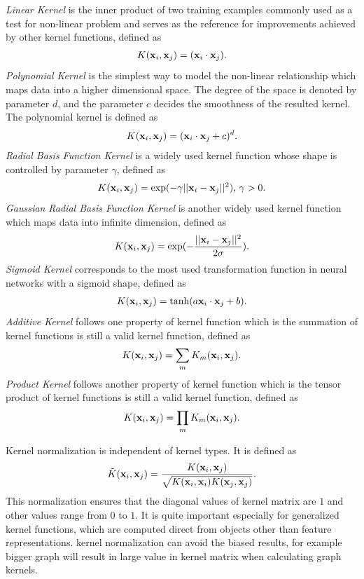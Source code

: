 \documentclass[english]{tktltiki}
\newcommand{\xb}{{\bf x}}
\begin{document}
{\em Linear Kernel} is the inner product of two training examples commonly used as a test for non-linear problem and serves as the reference for improvements achieved by other kernel functions, defined as
\begin{align*}
K(\xb_i,\xb_j) = (\xb_i \cdot \xb_j) \text{.}
\end{align*}
{\em Polynomial Kernel} is the simplest way to model the non-linear relationship which maps data into a higher dimensional space. The degree of the space is denoted by parameter $d$, and the parameter $c$ decides the smoothness of the resulted kernel. The polynomial kernel is defined as
\begin{align*}
K(\xb_i,\xb_j) = (\xb_i \cdot \xb_j + c)^d \text{.}
\end{align*}
{\em Radial Basis Function Kernel} is a widely used kernel function whose shape is controlled by parameter $\gamma$, defined as
\begin{align*}
K(\xb_i,\xb_j) = \exp(-\gamma{||\xb_i - \xb_j||^2}) \text{, } \gamma > 0 \text{.}
\end{align*}
{\em Gaussian Radial Basis Function Kernel} is another widely used kernel function which maps data into infinite dimension, defined as
\begin{align*}
K(\xb_i,\xb_j) = \exp(-\frac{||\xb_i - \xb_j||^2}{2\sigma}) \text{.}
\end{align*}
{\em Sigmoid Kernel} corresponds to the most used transformation function in neural networks with a sigmoid shape, defined as
\begin{align*}
K(\xb_i,\xb_j) = \tanh(a\xb_i \cdot \xb_j + b) \text{.}
\end{align*}
{\em Additive Kernel} follows one property of kernel function which is the summation of kernel functions is still a valid kernel function, defined as
\begin{align*}
K(\xb_i,\xb_j) = \sum_{m}{K_m(\xb_i,\xb_j)} \text{.}
\end{align*}
{\em Product Kernel} follows another property of kernel function which is the tensor product of kernel functions is still a valid kernel function, defined as
\begin{align*}
K(\xb_i,\xb_j) = \prod_{m}{K_m(\xb_i,\xb_j)} \text{.}
\end{align*}


Kernel normalization is independent of kernel types. It is defined as
\begin{align*}
\tilde{K}(\xb_i,\xb_j) = \frac{K(\xb_i,\xb_j)}{\sqrt{K(\xb_i,\xb_i)K(\xb_j,\xb_j)}} \text{.}
\end{align*}
This normalization ensures that the diagonal values of kernel matrix are $1$ and other values range from $0$ to $1$. It is quite important especially for generalized kernel functions, which are computed direct from objects other than feature representations. kernel normalization can avoid the biased results, for example bigger graph will result in large value in kernel matrix when calculating graph kernels.
\end{document}
